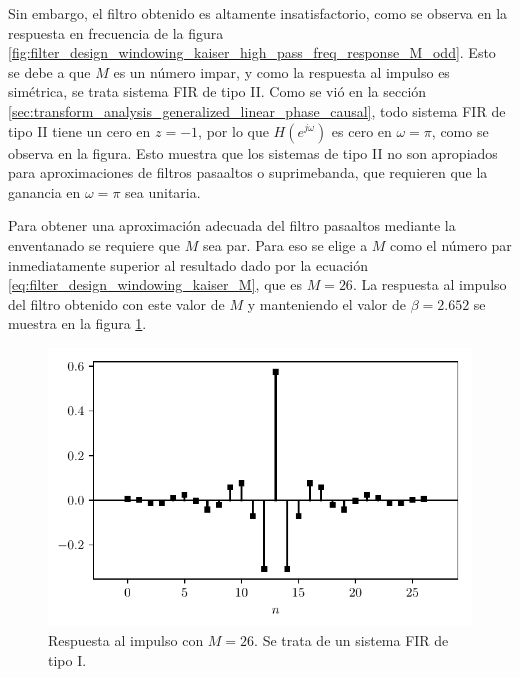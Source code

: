 \documentclass[a4paper]{report}
\begin{document}
Sin embargo, el filtro obtenido es altamente insatisfactorio, como se observa en la respuesta en frecuencia de la figura \ref{fig:filter_design_windowing_kaiser_high_pass_freq_response_M_odd}. Esto se debe a que \(M\) es un número impar, y como la respuesta al impulso es simétrica, se trata sistema FIR de tipo II. Como se vió en la sección \ref{sec:transform_analysis_generalized_linear_phase_causal}, todo sistema FIR de tipo II tiene un cero en \(z=-1\), por lo que  \(H(e^{j\omega})\) es cero en \(\omega=\pi\), como se observa en la figura. Esto muestra que los sistemas de tipo II no son apropiados para aproximaciones de filtros pasaaltos o suprimebanda, que requieren que la ganancia en \(\omega=\pi\) sea unitaria.

Para obtener una aproximación adecuada del filtro pasaaltos mediante la enventanado se requiere que \(M\) sea par. Para eso se elige a \(M\) como el número par inmediatamente superior al resultado dado por la ecuación \ref{eq:filter_design_windowing_kaiser_M}, que es \(M=26\). La respuesta al impulso del filtro obtenido con este valor de \(M\) y manteniendo el valor de \(\beta = 2.652\) se muestra en la figura \ref{fig:filter_design_windowing_kaiser_high_pass_impulse_response}.
\begin{figure}[!htb]
  \begin{minipage}[c]{0.7\textwidth}
    \includegraphics[width=\textwidth]{figuras/filter_design_windowing_kaiser_high_pass_impulse_response.pdf}
  \end{minipage}\hfill
  \begin{minipage}[c]{0.3\textwidth}
    \caption{
      Respuesta al impulso  con \(M=26\). Se trata de un sistema FIR de tipo I.
    }\label{fig:filter_design_windowing_kaiser_high_pass_impulse_response}
  \end{minipage}
\end{figure}
\end{document}
